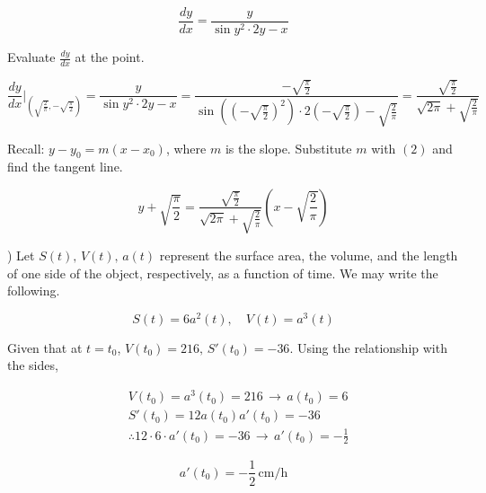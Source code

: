 \documentclass{article}
\begin{document}
\begin{equation}\frac{dy}{dx}= \frac y{\sin y^2 \cdot 2y - x}\end{equation}

\hfill

\noindent Evaluate $\displaystyle \frac{dy}{dx}$ at the point.

\begin{equation}\frac{dy}{dx}\Bigg|_{\left(\sqrt{\frac{2}{\pi}}, -\sqrt{\frac{\pi}{2}} \right)} = \frac y{\sin y^2 \cdot 2y - x} = \frac{-\sqrt{\frac{\pi}{2}}}{\sin\left(\left(-\sqrt{\frac{\pi}{2}}\right)^2 \right)\cdot 2\left(-\sqrt{\frac{\pi}{2}}\right) -\sqrt{\frac{2}{\pi}}} =\frac{\sqrt{\frac{\pi}{2}}}{ \sqrt{2\pi} +\sqrt{\frac{2}{\pi}}}\end{equation}

\hfill

\noindent Recall: $y-y_0 = m(x-x_0)$, where $m$ is the slope. Substitute $m$ with $(2)$ and find the tangent line.

\begin{equation*}
\boxed{y+\sqrt{\frac{\pi}{2}} = \frac{\displaystyle\sqrt{\frac{\pi}{2}}}{ \displaystyle\sqrt{2\pi} +\sqrt{\frac{2}{\pi}}}\left(x-\sqrt{\frac{2}{\pi}}\right)}
\end{equation*}

\hfill

) Let $S(t),\, V(t),\, a(t)$ represent the surface area, the volume, and the length of one side of the object, respectively, as a function of time. We may write the following.

\begin{equation*}
S(t) = 6a^2(t), \quad V(t) = a^3(t)
\end{equation*}

\hfill

\noindent Given that at $t=t_0$, $V(t_0) = 216, \,S'(t_0)=-36$. Using the relationship with the sides,

\begin{align*}
&V(t_0) = a^3(t_0)= 216\,\rightarrow\, a(t_0) = 6\\
&S'(t_0) = 12a(t_0)a'(t_0)=-36\\
&\therefore 12\cdot6\cdot a'(t_0)=-36 \,\rightarrow\, a'(t_0)=-\frac12
\end{align*}

\begin{equation*}
\boxed{a'(t_0) = -\frac12\,\text{cm/h}}
\end{equation*}

\newpage
\end{document}
